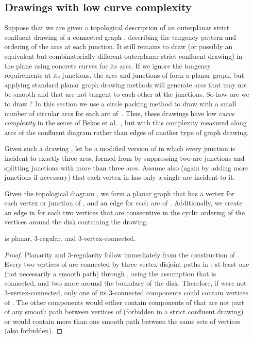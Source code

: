 \documentclass{llncs}
\begin{document}
\subsection{Drawings with low curve complexity}\label{sec:curvecomplexity}

Suppose that we are given a topological description of an outerplanar strict confluent drawing  of a connected graph , describing the tangency pattern and ordering of the arcs at each junction. It still remains to draw  (or possibly an equivalent but combinatorially different outerplanar strict confluent drawing) in the plane using concrete curves for its arcs. If we ignore the tangency requirements at its junctions, the arcs and junctions of  form a planar graph, but applying standard planar graph drawing methods will generate arcs that may not be smooth and that are not tangent to each other at the junctions. So how are we to draw ? In this section we use a circle packing method to draw  with a small number of circular arcs for each arc of~.
Thus, these drawings have low \emph{curve complexity} in the sense of Bekos et al.~\cite{BekKauKob-GD-12}, but with this complexity measured along arcs of the confluent diagram rather than edges of another type of graph drawing.


Given such a drawing , let  be a modified version of  in which every junction is incident to exactly three arcs, formed from  by suppressing two-arc junctions and splitting junctions with more than three arcs.
Assume also (again by adding more junctions if necessary) that each vertex in  has only a single arc incident to it.

Given the topological diagram , we form a planar graph  that has a vertex for each vertex or junction of , and an edge for each arc of .  Additionally, we create an edge in  for each two vertices that are consecutive in the cyclic ordering of the vertices around the disk containing the drawing.


\begin{lemma}
\label{lem:3-regular}
 is planar, 3-regular, and 3-vertex-connected.
\end{lemma}

\begin{proof}
Planarity and 3-regularity follow immediately from the construction of . Every two vertices of  are connected by three vertex-disjoint paths in : at least one (not necessarily a smooth path) through , using the assumption that  is connected, and two more around the boundary of the disk. Therefore, if  were not 3-vertex-connected, only one of its 3-connected components could contain vertices of . The other components would either contain components of  that are not part of any smooth path between vertices of  (forbidden in a strict confluent drawing) or would contain more than one smooth path between the same sets of vertices (also forbidden).
\end{proof}
\end{document}
